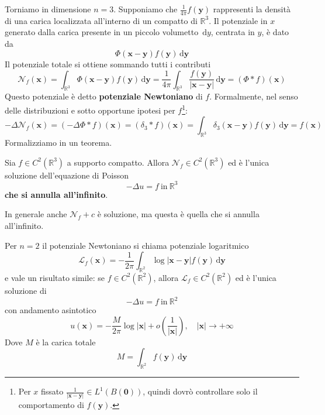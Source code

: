 \documentclass[10pt,a4paper,twoside,openright]{book}
\newcommand{\x}{\mathbf{x}}
\newcommand{\y}{\mathbf{y}}
\newcommand{\zer}{\mathbf{0}}
\newcommand{\de}{\,\mathrm d}
\newcommand{\dy}{\de y}
\newcommand{\dyy}{\de \y}
\begin{document}
Torniamo in dimensione $n=3$. Supponiamo che $\displaystyle \frac{1}{4\pi } f(\y)$ rappresenti la densità di una carica localizzata all'interno di un compatto di $\displaystyle \mathbb{R}^{3}$. Il potenziale in $x$ generato dalla carica presente in un piccolo volumetto $\dy$, centrata in $y$, è dato da
\begin{equation*}
	\Phi (\x-\y) f(\y) \dyy
\end{equation*}
Il potenziale totale si ottiene sommando tutti i contributi
\begin{equation}
	\mathcal{N}_{f}(\x) =\int _{\mathbb{R}^{3}} \Phi (\x-\y) f(\y) \dyy=\frac{1}{4\pi }\int _{\mathbb{R}^{3}}\frac{f(\y)}{|\x-\y| } \dyy=(\Phi \ast f)(\x)
\end{equation}
Questo potenziale è detto \textbf{potenziale Newtoniano} di $f$. Formalmente, nel senso delle distribuzioni e sotto opportune ipotesi per $f$\footnote{Per $x$ fissato $\frac{1}{|\x-\y| } \in L^{1}(B(\zer))$, quindi dovrò controllare solo il comportamento di $f(\y)$.}:
\begin{equation*}
	-\Delta \mathcal{N}_{f}(\x) =(-\Delta \Phi \ast f)(\x) =(\delta _{3} \ast f)(\x) =\int _{\mathbb{R}^{3}} \delta _{3}(\x-\y) f(\y) \dyy=f(\x)
\end{equation*}
Formalizziamo in un teorema.
\begin{theorem}
	Sia $\displaystyle f\in C^{2}\left(\mathbb{R}^{3}\right)$ a supporto compatto. Allora $\displaystyle \mathcal{N}_{f} \in C^{2}\left(\mathbb{R}^{3}\right)$ ed è l'unica soluzione dell'equazione di Poisson
	\begin{equation*}
		-\Delta u=f\ \text{in} \ \mathbb{R}^{3}
	\end{equation*}
	\textbf{che si annulla all'infinito}.
\end{theorem}
In generale anche $\mathcal{N}_{f}+c$ è soluzione, ma questa è quella che si annulla all'infinito.
\begin{nb}
	Per $n=2$ il potenziale Newtoniano si chiama potenziale logaritmico
	\begin{equation}
		\mathcal{L}_{f}(\x) =-\frac{1}{2\pi }\int _{\mathbb{R}^{2}}\log|\x-\y| f(\y) \dyy
	\end{equation}
	e vale un risultato simile: se $\displaystyle f\in C^{2}(\mathbb{R}^{2})$, allora $\displaystyle \mathcal{L}_{f} \in C^{2}(\mathbb{R}^{2})$ ed è l'unica soluzione di 
	\begin{equation*}
		-\Delta u=f\ \text{in} \ \mathbb{R}^{2}
	\end{equation*}
	con andamento asintotico
	\begin{equation*}
		u(\x) =-\frac{M}{2\pi }\log|\x| +o\left(\frac{1}{|\x| }\right),\quad |\x| \rightarrow +\infty 
	\end{equation*}
	Dove $M$ è la carica totale
	\begin{equation*}
		M=\int _{\mathbb{R}^{2}} f(\y) \dyy
	\end{equation*}
\end{nb}
\end{document}
